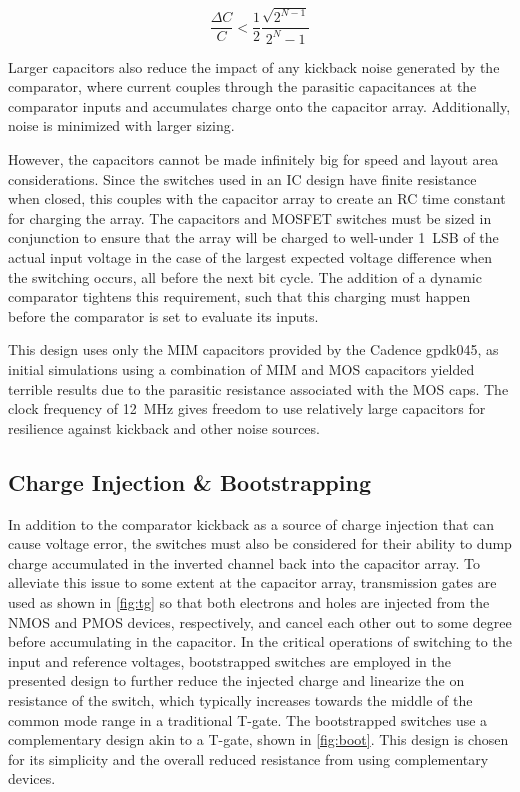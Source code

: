 \documentclass[11pt,letterpaper]{article}
\begin{document}
\begin{equation}
    \frac{\Delta C}{C} < \frac{1}{2}\frac{\sqrt{2^{N-1}}}{2^N-1} \label{eq:cap_mc}
\end{equation}

Larger capacitors also reduce the impact of any kickback noise generated by the comparator, where current couples through the parasitic capacitances at the comparator inputs and accumulates charge onto the capacitor array. Additionally,  noise is minimized with larger sizing.

However, the capacitors cannot be made infinitely big for speed and layout area considerations. Since the switches used in an IC design have finite resistance when closed, this couples with the capacitor array to create an RC time constant for charging the array. The capacitors and MOSFET switches must be sized in conjunction to ensure that the array will be charged to well-under \qty{1}{LSB} of the actual input voltage in the case of the largest expected voltage difference when the switching occurs, all before the next bit cycle. The addition of a dynamic comparator tightens this requirement, such that this charging must happen before the comparator is set to evaluate its inputs. 

This design uses only the MIM capacitors provided by the Cadence gpdk045, as initial simulations using a combination of MIM and MOS capacitors yielded terrible results due to the parasitic resistance associated with the MOS caps. The clock frequency of \qty{12}{\MHz} gives freedom to use relatively large capacitors for resilience against kickback and other noise sources.

\subsection{Charge Injection \& Bootstrapping}

In addition to the comparator kickback as a source of charge injection that can cause voltage error, the switches must also be considered for their ability to dump charge accumulated in the inverted channel back into the capacitor array. To alleviate this issue to some extent at the capacitor array, transmission gates are used as shown in \cref{fig:tg} so that both electrons and holes are injected from the NMOS and PMOS devices, respectively, and cancel each other out to some degree before accumulating in the capacitor. In the critical operations of switching to the input and reference voltages, bootstrapped switches are employed in the presented design to further reduce the injected charge and linearize the on resistance of the switch, which typically increases towards the middle of the common mode range in a traditional T-gate. The bootstrapped switches use a complementary design akin to a T-gate, shown in \cref{fig:boot}. This design is chosen for its simplicity and the overall reduced resistance from using complementary devices.
\end{document}
